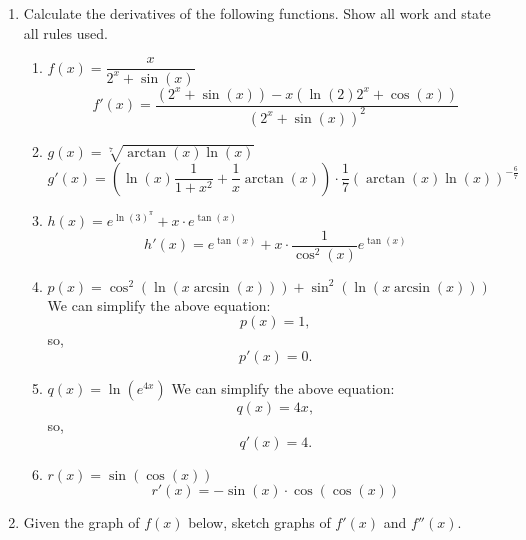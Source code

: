 \documentclass[11pt]{article}
\begin{document}
\begin{enumerate}
\begin{enumerate}
  \end{enumerate}

\newpage

\item Calculate the derivatives of the following functions.  Show all
  work and state all rules used.
  \begin{enumerate}
  \item $f(x)=\dfrac{x}{2^x+\sin(x)}$
    \vfill
    {\color{blue}
      \[
      f'(x) = \frac{(2^x+\sin(x))-x(\ln(2)2^x+\cos(x))}{(2^x+\sin(x))^2}
      \]
    }
    \vfill
  \item $g(x)=\sqrt[7]{\arctan(x)\ln(x)}$
    \vfill
    {\color{blue}
      \[
      g'(x) =
      \left(\ln(x)\frac{1}{1+x^2}+\frac{1}{x}\arctan(x)\right)\cdot
      \frac{1}{7}\left(\arctan(x)\ln(x)\right)^{-\frac{6}{7}}
      \]
    }
    \vfill
    \newpage
  \item $h(x)=e^{\ln(3)^{\pi}} + x\cdot e^{\tan(x)}$
    \vfill
    {\color{blue}
      \[
      h'(x) = e^{\tan(x)} + x\cdot\frac{1}{\cos^2(x)}e^{\tan(x)}
      \]
    }
    \vfill
  \item $p(x)=\cos^2\left(\ln(x\arcsin(x))\right)+\sin^2(\ln(x\arcsin(x)))$
    \vfill
    {\color{blue}
      We can simplify the above equation:
      \[
      p(x)=1,
      \]
      so,
      \[
      p'(x)=0.
      \]
    }
    \vfill
    \newpage
  \item $q(x)=\ln\left(e^{4x}\right)$
    \vfill
    {\color{blue}
      We can simplify the above equation:
      \[
      q(x)=4x,
      \]
      so,
      \[
      q'(x)=4.
      \]
    }
    \vfill
  \item $r(x)=\sin(\cos(x))$
    \vfill
    {\color{blue}
      \[
      r'(x) = -\sin(x)\cdot\cos(\cos(x))
      \]
    }
    \vfill
  \end{enumerate}

\newpage

\item Given the graph of $f(x)$ below, sketch graphs of $f'(x)$ and $f''(x)$.

\begin{center}
\end{center}
\vfill
\begin{center}
\end{center}
\end{enumerate}
\end{document}
